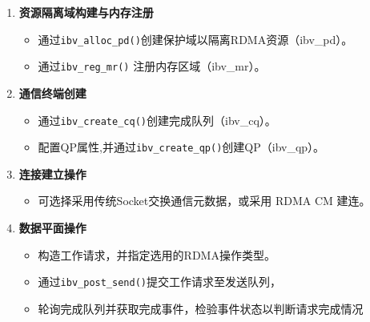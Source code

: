{\begin{enumerate}[label=\textbf{步骤 \arabic*.}, leftmargin=0.5cm, align=left]
    \item \textbf{资源隔离域构建与内存注册}
    \begin{itemize}
        \item 通过\texttt{ibv\_alloc\_pd()}创建保护域以隔离RDMA资源（ibv\_pd）。
        \item 通过\texttt{ibv\_reg\_mr()} 注册内存区域（ibv\_mr）。
    \end{itemize}
    
    \item \textbf{通信终端创建}
    \begin{itemize}
        \item 通过\texttt{ibv\_create\_cq()}创建完成队列（ibv\_cq）。
        \item 配置QP属性,并通过\texttt{ibv\_create\_qp()}创建QP（ibv\_qp）。
    \end{itemize}
    
    \item \textbf{连接建立操作}
    \begin{itemize}
        \item 可选择采用传统Socket交换通信元数据，或采用 RDMA CM 建连。
    \end{itemize}
    
    \item \textbf{数据平面操作}
    \begin{itemize}
        \item 构造工作请求，并指定选用的RDMA操作类型。
        \item 通过\texttt{ibv\_post\_send()}提交工作请求至发送队列，
        \item 轮询完成队列并获取完成事件，检验事件状态以判断请求完成情况
    \end{itemize}
    

\end{enumerate}}
